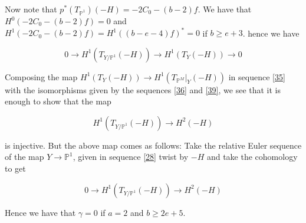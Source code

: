 \documentclass[11pt,twoside]{amsart}
\theoremstyle{plain}
\numberwithin{equation}{section}
\theoremstyle{definition}
\begin{document}
Now note that $p^*(T_{\mathbb{P}^1})(-H) = -2C_0-(b-2)f$. We have that $H^0(-2C_0-(b-2)f) = 0$ and $H^1(-2C_0-(b-2)f) = H^1((b-e-4)f)^* = 0$ if $b \geq e+3$. hence we have 

\begin{equation}\label{39}
    0 \to H^1(T_{Y/\mathbb{P}^1}(-H)) \to H^1(T_Y(-H)) \to  0
\end{equation}

Composing the map $H^1(T_Y(-H)) \to H^1(T_{\mathbb{P}^M}|_Y(-H))$ in sequence \ref{35} with the isomorphisms given by the sequences \ref{36} and \ref{39}, we see that it is enough to show that the map 

\begin{equation}\label{40}
     H^1(T_{Y/\mathbb{P}^1}(-H)) \to H^2(-H)
\end{equation}

is injective. But the above map comes as follows: Take the relative Euler sequence of the map $Y \to \mathbb{P}^1$, given in sequence \ref{28} twist by $-H$ and take the cohomology to get

\begin{equation}\label{41}
    0 \to H^1(T_{Y/\mathbb{P}^1}(-H)) \to H^2(-H)
\end{equation}

Hence we have that $\gamma = 0$ if $a = 2$ and $b \geq 2e+5$. \\
\end{document}
